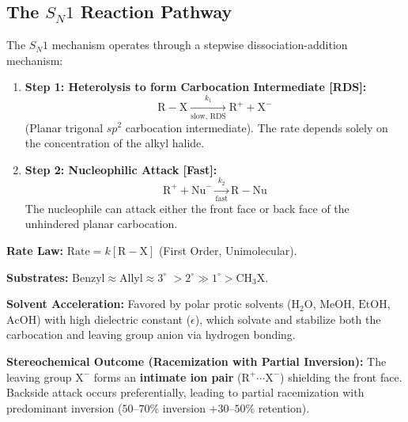 \documentclass[10pt,twoside,openright]{book}
\begin{document}
\subsection{The \texorpdfstring{$S_N1$}{SN1} Reaction Pathway}

\begin{conceptbox}
The $S_N1$ mechanism operates through a stepwise dissociation-addition mechanism:
\begin{enumerate}[leftmargin=*]
  \item \textbf{Step 1: Heterolysis to form Carbocation Intermediate [RDS]:}
  \begin{equation}
    \mathrm{R-X} \xrightarrow[\text{slow, RDS}]{k_1} \mathrm{R}^+ + \mathrm{X}^-
  \end{equation}
  (Planar trigonal $sp^2$ carbocation intermediate).
  The rate depends solely on the concentration of the alkyl halide.
  \item \textbf{Step 2: Nucleophilic Attack [Fast]:}
  \begin{equation}
    \mathrm{R}^+ + \mathrm{Nu}^- \xrightarrow[\text{fast}]{k_2} \mathrm{R-Nu}
  \end{equation}
  The nucleophile can attack either the front face or back face of the unhindered planar carbocation.
\end{enumerate}
\end{conceptbox}

\begin{formulabox}
\textbf{Rate Law:} $\text{Rate} = k[\mathrm{R-X}]$ (First Order, Unimolecular).

\textbf{Substrates:} $\text{Benzyl} \approx \text{Allyl} \approx 3^\circ$ $> 2^\circ \gg 1^\circ > \mathrm{CH_3X}$.

\textbf{Solvent Acceleration:} Favored by polar protic solvents ($\mathrm{H_2O}$, $\mathrm{MeOH}$, $\mathrm{EtOH}$, $\mathrm{AcOH}$) with high dielectric constant ($\epsilon$), which solvate and stabilize both the carbocation and leaving group anion via hydrogen bonding.

\textbf{Stereochemical Outcome (Racemization with Partial Inversion):}
The leaving group $\mathrm{X}^-$ forms an \textbf{intimate ion pair} ($\mathrm{R^+\cdots X^-}$) shielding the front face. Backside attack occurs preferentially, leading to partial racemization with predominant inversion ($50\text{--}70\%$ inversion $+ 30\text{--}50\%$ retention).
\end{formulabox}
\end{document}
